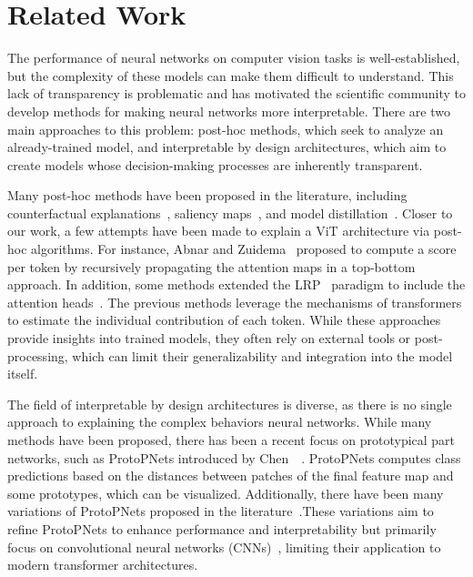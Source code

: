 
\section{Related Work}

The performance of neural networks on computer vision tasks is well-established, but the complexity of these models can make them difficult to understand. This lack of transparency is problematic and has motivated the scientific community to develop methods for making neural networks more interpretable. There are two main approaches to this problem: post-hoc methods, which seek to analyze an already-trained model, and interpretable by design architectures, which aim to create models whose decision-making processes are inherently transparent.

Many post-hoc methods have been proposed in the literature, including counterfactual explanations~\cite{augustin2022diffusion,Jeanneret_2023_CVPR,zemni2023octet}, saliency maps~\cite{Wang_2023_ICCV,Jalwana_2021_CVPR,8237336,Petsiuk2018rise}, and model distillation~\cite{Ge_2021_CVPR,tan2018learning}. 
Closer to our work, a few attempts have been made to explain a ViT architecture via post-hoc algorithms. 
For instance, Abnar and Zuidema~\cite{abnar2020quantifying} proposed to compute a score per token by recursively propagating the attention maps in a top-bottom approach. 
In addition, some methods extended the LRP~\cite{bach2015pixel} paradigm to include the attention heads~\cite{chefer2021generic,Chefer_2021_CVPR}. 
The previous methods leverage the mechanisms of transformers to estimate the individual contribution of each token. 
While these approaches provide insights into trained models, they often rely on external tools or post-processing, which can limit their generalizability and integration into the model itself.
 


 
The field of interpretable by design architectures is diverse, as there is no single approach to explaining the complex behaviors neural networks. While many methods have been proposed, there has been a recent focus on prototypical part networks, such as ProtoPNets introduced by Chen~\etal~\cite{NEURIPS2019_adf7ee2d}. ProtoPNets computes class predictions based on the distances between patches of the final feature map and some prototypes, which can be visualized. 
Additionally, there have been many variations of ProtoPNets proposed in the literature~\cite{wang2023learning,Nauta_2023_CVPR,nauta2021looks,carmichael2024pixel,bontempelli2023conceptlevel,ukai2023this, rymarczyk2021interpretable,Wang_2021_ICCV,nauta2021neural,donnelly2022deformable,Dai_2017_ICCV,hase2019interpretable}.These variations aim to refine ProtoPNets to enhance performance and interpretability but primarily focus on convolutional neural networks (CNNs)~\cite{7780459,Simonyan15}, limiting their application to modern transformer architectures.

